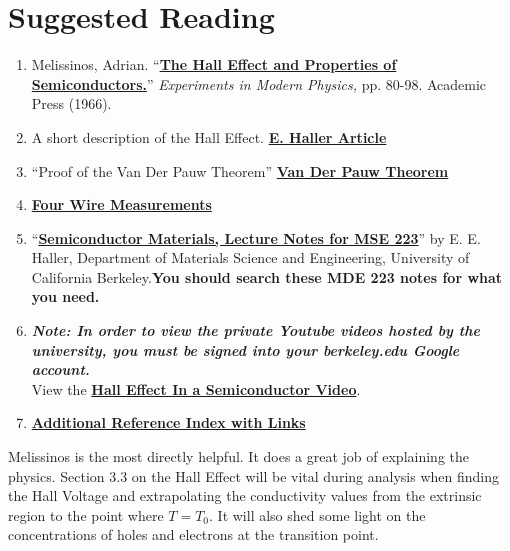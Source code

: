\documentclass{../lab}
\begin{document}
\section{Suggested Reading}
\label{sec:suggestedreading}

\begin{enumerate}
    \item Melissinos, Adrian. ``\href{https://drive.google.com/file/d/1fit2lQguqWaJHAVRKLo97_OcTTPWer4R/view?usp=drive_link}{\textbf{\textbf{The Hall Effect and Properties of Semiconductors}.}}'' \emph{Experiments in Modern Physics,} pp. 80-98. Academic Press (1966).

    \item A short description of the Hall Effect. \href{https://drive.google.com/file/d/1aaxKBCAtrejprBYuUYWViohH6TsHiIo8/view?usp=drive_link}{\textbf{E. Haller Article}}

    \item ``Proof of the Van Der Pauw Theorem'' \href{https://berkeley-physics111b.github.io/appendices/SHE-Van-Der-Pauw-Theorem/}{\textbf{\textbf{Van Der Pauw Theorem}}}

    \item \href{https://drive.google.com/file/d/1tisFCjo3m3rmWQDQSPz5t88OU2G4YqMj/view?usp=drive_link}{\textbf{Four Wire Measurements}}

    \item ``\href{https://drive.google.com/file/d/12K8sMm8MqrjoX3WLgf6zMQnpjTuHkVF8/view?usp=drive_link}{\textbf{Semiconductor Materials, Lecture Notes for MSE 223}}'' by E. E. Haller, Department of Materials Science and Engineering, University of California Berkeley.\textbf{You should search these MDE 223 notes for what you need.}

    \item\emph{\textbf{Note: In order to view the private Youtube videos hosted by the university, you must be signed into your berkeley.edu Google account.}}\\
    View the \href{http://youtu.be/7JYq1rRl6Xk}{\textbf{Hall Effect In a Semiconductor Video}}.

    \item    \href{https://drive.google.com/file/d/1Z5C1MuOiTkrgxyS_XC_M4uttNVkzjTO6/view?usp=drive_link}{\textbf{Additional Reference Index with Links}}

\end{enumerate}

Melissinos is the most directly helpful. It does a great job of explaining the physics. Section 3.3 on the Hall Effect will be vital during analysis when finding the Hall Voltage and extrapolating the conductivity values from the extrinsic region to the point where $T = T_{0}$. It will also shed some light on the concentrations of holes and electrons at the transition point.
\end{document}
